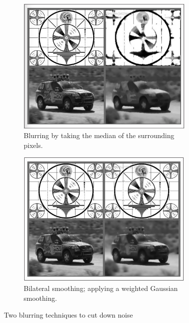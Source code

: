 \begin{figure}
\centering
\begin{subfigure}{0.4\textwidth}
 \centering
 \includegraphics[width=0.95\textwidth]{"./image/median_blurring"}
 \caption{Blurring by taking the median of the surrounding pixels.}
 \label{fig:blurring:sub1}
\end{subfigure}
\begin{subfigure}{0.4\textwidth}
 \centering
 \includegraphics[width=0.95\textwidth]{"./image/bilateral_smoothing"}
 \caption{Bilateral smoothing; applying a weighted Gaussian smoothing.}
 \label{fig:blurring:sub2}
\end{subfigure}
\caption{Two blurring techniques to cut down noise}
\label{fig:blurring}
\end{figure}


